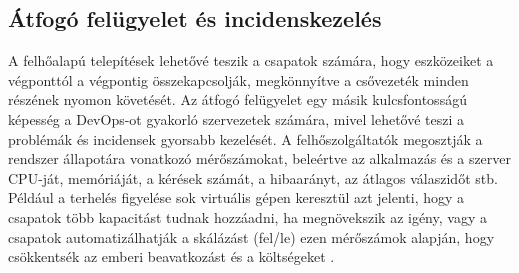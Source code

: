 \subsection*{Átfogó felügyelet és incidenskezelés}
A felhőalapú telepítések lehetővé teszik a csapatok számára, hogy eszközeiket a végponttól a végpontig összekapcsolják, megkönnyítve a csővezeték minden részének nyomon követését.
Az átfogó felügyelet egy másik kulcsfontosságú képesség a DevOps-ot gyakorló szervezetek számára, mivel lehetővé teszi a problémák és incidensek gyorsabb kezelését.
A felhőszolgáltatók megosztják a rendszer állapotára vonatkozó mérőszámokat, beleértve az alkalmazás és a szerver CPU-ját, memóriáját, a kérések számát, a hibaarányt, az átlagos válaszidőt stb. Például a terhelés figyelése sok virtuális gépen keresztül azt jelenti, hogy a csapatok több kapacitást tudnak hozzáadni, ha megnövekszik az igény, vagy a csapatok automatizálhatják a skálázást (fel/le) ezen mérőszámok alapján, hogy csökkentsék az emberi beavatkozást és a költségeket \cite{cloudComp}.